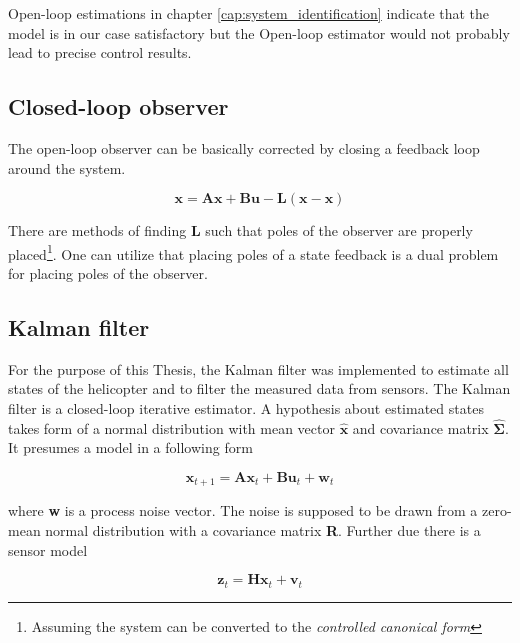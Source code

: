 Open-loop estimations in chapter \ref{cap:system_identification} indicate that the model is in our case satisfactory but the Open-loop estimator would not probably lead to precise control results.

\subsection{Closed-loop observer}

The open-loop observer can be basically corrected by closing a feedback loop around the system.

\begin{equation}
\textbf{\^x} = \textbf{A}\textbf{\^x} + \textbf{B}\textbf{u} - \textbf{L}\left(\textbf{x} - \textbf{\^x}\right)
\label{eq:closed_loop_observer}
\end{equation}

There are methods of finding $\textbf{L}$ such that poles of the observer are properly placed\footnote{Assuming the system can be converted to the \textit{controlled canonical form}}. One can utilize that placing poles of a state feedback is a dual problem for placing poles of the observer.

\subsection{Kalman filter}

For the purpose of this Thesis, the Kalman filter was implemented to estimate all states of the helicopter and to filter the measured data from sensors. The Kalman filter is a closed-loop iterative estimator. A hypothesis about estimated states takes form of a normal distribution with mean vector $\hat{\textbf{x}}$ and covariance matrix $\hat{\boldsymbol{\Sigma}}$. It presumes a model in a following form

\begin{equation}
\textbf{x}_{t+1} = \textbf{A}\textbf{x}_t + \textbf{B}\textbf{u}_t + \textbf{w}_t
\end{equation}

where \textbf{w} is a process noise vector. The noise is supposed to be drawn from a zero-mean normal distribution with a covariance matrix \textbf{R}. Further due there is a sensor model

\begin{equation}
\textbf{z}_t = \textbf{H}\textbf{x}_t + \textbf{v}_t
\end{equation}

